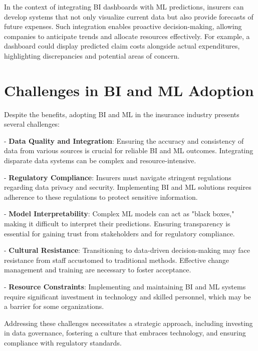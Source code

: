 In the context of integrating BI dashboards with ML predictions, insurers can develop systems that not only visualize current data but also provide forecasts of future expenses. Such integration enables proactive decision-making, allowing companies to anticipate trends and allocate resources effectively. For example, a dashboard could display predicted claim costs alongside actual expenditures, highlighting discrepancies and potential areas of concern.

\section{Challenges in BI and ML Adoption}

Despite the benefits, adopting BI and ML in the insurance industry presents several challenges:

- \textbf{Data Quality and Integration}: Ensuring the accuracy and consistency of data from various sources is crucial for reliable BI and ML outcomes. Integrating disparate data systems can be complex and resource-intensive.

- \textbf{Regulatory Compliance}: Insurers must navigate stringent regulations regarding data privacy and security. Implementing BI and ML solutions requires adherence to these regulations to protect sensitive information.

- \textbf{Model Interpretability}: Complex ML models can act as "black boxes," making it difficult to interpret their predictions. Ensuring transparency is essential for gaining trust from stakeholders and for regulatory compliance.

- \textbf{Cultural Resistance}: Transitioning to data-driven decision-making may face resistance from staff accustomed to traditional methods. Effective change management and training are necessary to foster acceptance.

- \textbf{Resource Constraints}: Implementing and maintaining BI and ML systems require significant investment in technology and skilled personnel, which may be a barrier for some organizations.

Addressing these challenges necessitates a strategic approach, including investing in data governance, fostering a culture that embraces technology, and ensuring compliance with regulatory standards.